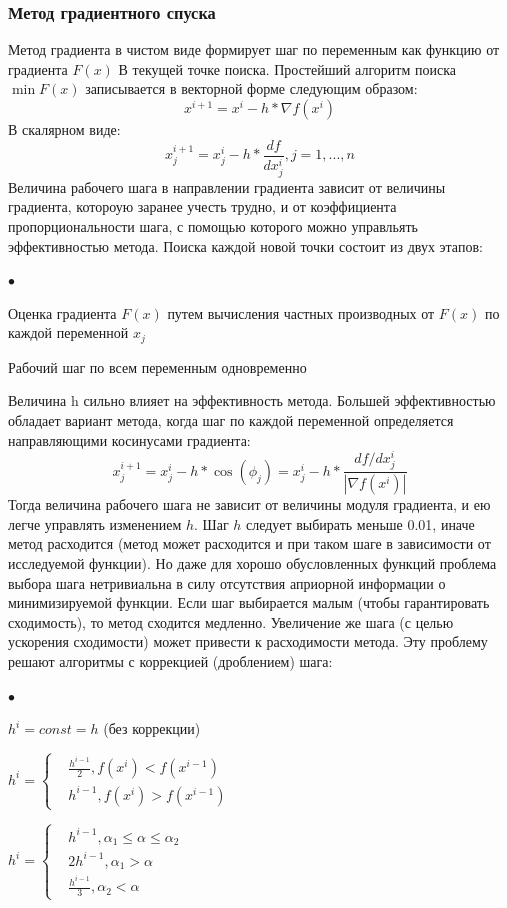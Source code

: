 \documentclass[12pt, a4paper]{article}
\newenvironment{compactlist}{
    \begin{list}{{$\bullet$}}{
      \setlength\partopsep{0pt}
      \setlength\parskip{0pt}
      \setlength\parsep{0pt}
      \setlength\topsep{0pt}
      \setlength\itemsep{0pt}
} }{
\end{list} }
\begin{document}
	\subsubsection*{Метод градиентного спуска}
	Метод градиента в чистом виде формирует шаг по переменным как функцию от градиента $F(x)$ В текущей точке поиска. Простейший алгоритм поиска $\min F(x)$ записывается в векторной форме следующим образом:
	$$
	x^{i+1} = x^i - h * \nabla f(x^i)
	$$
	В скалярном виде:
	$$
	x^{i+1}_j = x^i_j - h * \frac{df}{dx^i_j}, j = 1,...,n
	$$
	Величина рабочего шага в направлении градиента зависит от величины градиента, котороую заранее учесть трудно, и от коэффициента пропорциональности шага, с помощью которого можно управльять эффективностью метода.
	Поиска каждой новой точки состоит из двух этапов:
	\begin{compactlist}
		\item Оценка градиента $F(x)$ путем вычисления частных производных от $F(x)$ по каждой переменной $x_j$
		\item Рабочий шаг по всем переменным одновременно
	\end{compactlist}
	Величина h сильно влияет на эффективность метода. Большей эффективностью обладает вариант метода, когда шаг по каждой переменной определяется направляющими косинусами градиента:
	$$
	x^{i+1}_j = x^i_j - h * \cos(\phi_j) = x^i_j - h * \frac{df/dx^i_j}{|\nabla f(x^i)|}
	$$
	Тогда величина рабочего шага не зависит от величины модуля градиента, и ею легче управлять изменением $h$. Шаг $h$ следует выбирать меньше 0.01, иначе метод расходится (метод может расходится и при таком шаге в зависимости от исследуемой функции).
	Но даже для хорошо обусловленных функций проблема выбора шага нетривиальна в силу отсутствия априорной информации о минимизируемой функции. Если шаг выбирается малым (чтобы гарантировать сходимость), то метод сходится медленно. Увеличение же шага (с целью ускорения сходимости) может привести к расходимости метода. Эту проблему решают алгоритмы с коррекцией (дроблением) шага:
	\begin{compactlist}
		\item $h^i = const = h$ (без коррекции)
		\item $h^i = 
				\left\{\begin{aligned}
				& \frac{h^{i-1}}{2},  f(x^i) < f(x^{i-1}) \\ 
				& h^{i-1},  f(x^i) > f(x^{i-1})
				\end{aligned}\right.$
		\item $h^i = 
				\left\{\begin{aligned}
				& h^{i-1},  \alpha_1 \le \alpha \le \alpha_2 \\ 
				& 2h^{i-1},  \alpha_1 > \alpha \\
				& \frac{h^{i-1}}{3},  \alpha_2 < \alpha
				\end{aligned}\right.$
	\end{compactlist}
\end{document}
